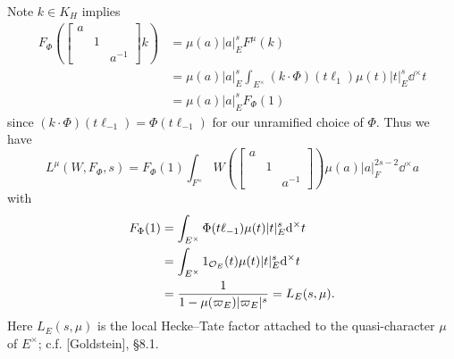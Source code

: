 Note $k \in K_H$ implies
\begin{align*}
    F_\Phi \left(\begin{bmatrix}
        a & & \\ & 1 & \\ & & a^{-1}
    \end{bmatrix}k\right) &= \mu(a) |a|_E^s F^\mu(k) \\
    &= \mu(a)|a|_E^s \int_{E^\times} (k \cdot \Phi) (t \ell_{1}) \mu(t) |t|_E^s \dd^\times t \\
    &= \mu(a) |a|_E^s F_\Phi(1)
\end{align*}
since $(k \cdot \Phi)(t \ell_{-1}) = \Phi(t \ell_{-1})$ for our unramified choice of $\Phi$.
Thus we have
\[
    L^\mu(W, F_\Phi, s) = F_\Phi(1) \int_{F^\times} W\left(\begin{bmatrix}
        a & & \\ & 1 & \\ & & a^{-1}
    \end{bmatrix}\right) \mu(a) |a|_F^{2s - 2} \dd^\times a
\]
with
\begin{align*}
    F_\Phi(1) &= \int_{E^\times}\Phi(t \ell_{-1}) \mu(t) |t|_E^s \mathrm{d}^\times t \\
    &= \int_{E^\times} 1_{\mathcal{O}_E} (t) \mu(t) |t|_E^s \mathrm{d}^\times t \\
    &= \frac{1}{1 - \mu(\varpi_E) |\varpi_E|^{s}} = L_E(s, \mu).
\end{align*}
Here $L_E(s, \mu)$ is the local Hecke--Tate factor attached to the quasi-character $\mu$ of $E^\times$; c.f. [Goldstein], \S 8.1.
